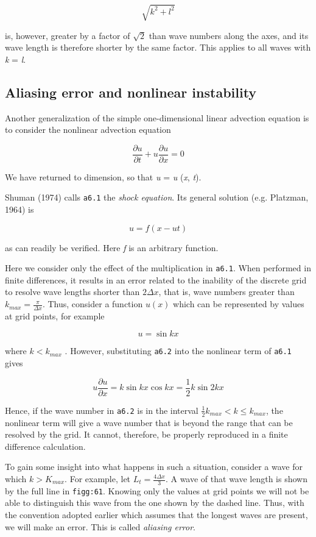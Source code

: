 \[\sqrt{k^{2} + l^{2}}\]

is, however, greater by a factor of \(\sqrt{2}\) than wave numbers along
the axes, and its wave length is therefore shorter by the same factor.
This applies to all waves with \emph{k} = \emph{l}.

\subsection{\texorpdfstring{\textbf{Aliasing error and nonlinear
instability}}{Aliasing error and nonlinear instability}}\label{aliasing-error-and-nonlinear-instability}

Another generalization of the simple one-dimensional linear advection
equation is to consider the nonlinear advection equation

{\[\frac{\partial u}{\partial t} + u\frac{\partial u}{\partial x} = 0\]}

We have returned to dimension, so that \emph{u} = \emph{u} (\emph{x},
\emph{t}).

Shuman (1974) calls \texttt{a6.1} the \emph{shock equation}. Its general
solution (e.g. Platzman, 1964) is

\[u = f\left( x - ut \right)\]

as can readily be verified. Here \emph{f} is an arbitrary function.

Here we consider only the effect of the multiplication in \texttt{a6.1}.
When performed in finite differences, it results in an error related to
the inability of the discrete grid to resolve wave lengths shorter than
\(2\Delta x\), that is, wave numbers greater than
\(k_{max} = \frac{\pi}{\Delta x}\). Thus, consider a function
\(u\left( x \right)\) which can be represented by values at grid points,
for example

{\[u = \sin{kx}\]}

where \({k < k}_{max}\) . However, substituting \texttt{a6.2} into the
nonlinear term of \texttt{a6.1} gives

\[u\frac{\partial u}{\partial x} = k\sin{kx}\cos{kx} = \frac{1}{2}k\sin{2kx}\]

Hence, if the wave number in \texttt{a6.2} is in the interval
\(\frac{1}{2}k_{max} < k \leq k_{max}\), the nonlinear term will give a
wave number that is beyond the range that can be resolved by the grid.
It cannot, therefore, be properly reproduced in a finite difference
calculation.

To gain some insight into what happens in such a situation, consider a
wave for which \(k > K_{max}\). For example, let
\(L_{t} = \frac{4\Delta x}{3}\). A wave of that wave length is shown by
the full line in \texttt{figg:61}. Knowing only the values at grid
points we will not be able to distinguish this wave from the one shown
by the dashed line. Thus, with the convention adopted earlier which
assumes that the longest waves are present, we will make an error. This
is called \emph{aliasing error}.

